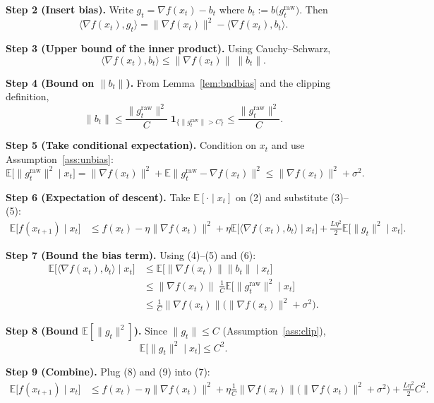 \documentclass{article}
\newcommand{\E}{\mathbb{E}}
\begin{document}
\noindent\textbf{Step 2 (Insert bias).}  
Write $g_{t}= \nabla f(x_{t})-b_{t}$ where $b_{t}:=b\!\bigl(g^{\text{raw}}_{t}\bigr)$.  
Then
\[
\langle\nabla f(x_{t}),g_{t}\rangle
= \|\nabla f(x_{t})\|^{2}-\langle\nabla f(x_{t}),b_{t}\rangle .
\tag{3}
\]

\noindent\textbf{Step 3 (Upper bound of the inner product).}  
Using Cauchy–Schwarz,
\[
\langle\nabla f(x_{t}),b_{t}\rangle\le\|\nabla f(x_{t})\|\;\|b_{t}\|.
\tag{4}
\]

\noindent\textbf{Step 4 (Bound on $\|b_{t}\|$).}  
From Lemma~\ref{lem:bndbias} and the clipping definition,
\[
\|b_{t}\|\le\frac{\|g^{\text{raw}}_{t}\|^{2}}{C}\; \mathbf{1}_{\{\|g^{\text{raw}}_{t}\|>C\}}
\le\frac{\|g^{\text{raw}}_{t}\|^{2}}{C}.
\tag{5}
\]

\noindent\textbf{Step 5 (Take conditional expectation).}  
Condition on $x_{t}$ and use Assumption~\ref{ass:unbias}:
\[
\E\!\bigl[\|g^{\text{raw}}_{t}\|^{2}\mid x_{t}\bigr]
= \|\nabla f(x_{t})\|^{2}+\E\!\bigl\|g^{\text{raw}}_{t}-\nabla f(x_{t})\bigr\|^{2}
\le \|\nabla f(x_{t})\|^{2}+\sigma^{2}.
\tag{6}
\]

\noindent\textbf{Step 6 (Expectation of descent).}  
Take $\E[\cdot\mid x_{t}]$ on (2) and substitute (3)–(5):
\[
\begin{aligned}
\E\!\bigl[f(x_{t+1})\mid x_{t}\bigr]
&\le f(x_{t})-\eta\|\nabla f(x_{t})\|^{2}
   +\eta\E\!\bigl[\langle\nabla f(x_{t}),b_{t}\rangle\mid x_{t}\bigr]
   +\frac{L\eta^{2}}{2}\E\!\bigl[\|g_{t}\|^{2}\mid x_{t}\bigr].
\end{aligned}
\tag{7}
\]

\noindent\textbf{Step 7 (Bound the bias term).}  
Using (4)–(5) and (6):
\[
\begin{aligned}
\E\!\bigl[\langle\nabla f(x_{t}),b_{t}\rangle\mid x_{t}\bigr]
&\le \E\!\bigl[\|\nabla f(x_{t})\|\|b_{t}\|\mid x_{t}\bigr] \\
&\le \|\nabla f(x_{t})\|\;\frac{1}{C}\E\!\bigl[\|g^{\text{raw}}_{t}\|^{2}\mid x_{t}\bigr] \\
&\le \frac{1}{C}\|\nabla f(x_{t})\|\bigl(\|\nabla f(x_{t})\|^{2}+\sigma^{2}\bigr) .
\end{aligned}
\tag{8}
\]

\noindent\textbf{Step 8 (Bound $\E[\|g_{t}\|^{2}]$).}  
Since $\|g_{t}\|\le C$ (Assumption~\ref{ass:clip}),  
\[
\E\!\bigl[\|g_{t}\|^{2}\mid x_{t}\bigr]\le C^{2}.
\tag{9}
\]

\noindent\textbf{Step 9 (Combine).}  
Plug (8) and (9) into (7):
\[
\begin{aligned}
\E\!\bigl[f(x_{t+1})\mid x_{t}\bigr]
&\le f(x_{t})
   -\eta\|\nabla f(x_{t})\|^{2}
   +\eta\frac{1}{C}\|\nabla f(x_{t})\|\bigl(\|\nabla f(x_{t})\|^{2}+\sigma^{2}\bigr)
   +\frac{L\eta^{2}}{2}C^{2}.
\end{aligned}
\tag{10}
\]
\end{document}

